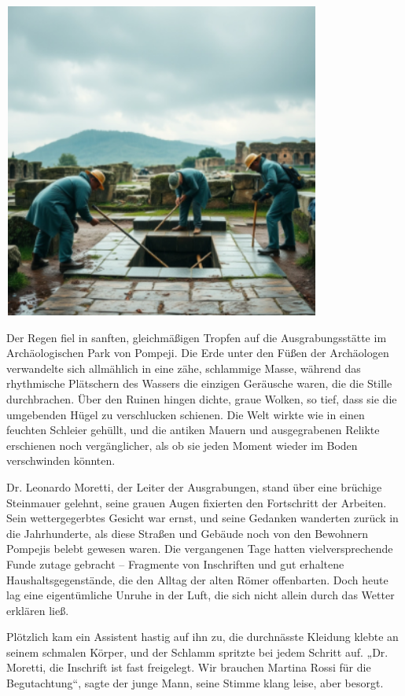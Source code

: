 \documentclass[
]{article}
\begin{document}
\includegraphics[width=4.11458in,height=4.09375in]{media/image002.png}

Der Regen fiel in sanften, gleichmäßigen Tropfen auf die
Ausgrabungsstätte im Archäologischen Park von Pompeji. Die Erde unter
den Füßen der Archäologen verwandelte sich allmählich in eine zähe,
schlammige Masse, während das rhythmische Plätschern des Wassers die
einzigen Geräusche waren, die die Stille durchbrachen. Über den Ruinen
hingen dichte, graue Wolken, so tief, dass sie die umgebenden Hügel zu
verschlucken schienen. Die Welt wirkte wie in einen feuchten Schleier
gehüllt, und die antiken Mauern und ausgegrabenen Relikte erschienen
noch vergänglicher, als ob sie jeden Moment wieder im Boden verschwinden
könnten.

Dr. Leonardo Moretti, der Leiter der Ausgrabungen, stand über eine
brüchige Steinmauer gelehnt, seine grauen Augen fixierten den
Fortschritt der Arbeiten. Sein wettergegerbtes Gesicht war ernst, und
seine Gedanken wanderten zurück in die Jahrhunderte, als diese Straßen
und Gebäude noch von den Bewohnern Pompejis belebt gewesen waren. Die
vergangenen Tage hatten vielversprechende Funde zutage gebracht --
Fragmente von Inschriften und gut erhaltene Haushaltsgegenstände, die
den Alltag der alten Römer offenbarten. Doch heute lag eine
eigentümliche Unruhe in der Luft, die sich nicht allein durch das Wetter
erklären ließ.

Plötzlich kam ein Assistent hastig auf ihn zu, die durchnässte Kleidung
klebte an seinem schmalen Körper, und der Schlamm spritzte bei jedem
Schritt auf. „Dr. Moretti, die Inschrift ist fast freigelegt. Wir
brauchen Martina Rossi für die Begutachtung``, sagte der junge Mann,
seine Stimme klang leise, aber besorgt.
\end{document}
